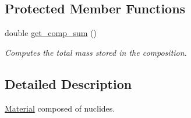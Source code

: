 \subsection*{Protected Member Functions}
\begin{DoxyCompactItemize}
\item 
\hypertarget{classpyne_1_1_material_a6bfe2556962da33cc05eb1e88bdebf42}{double \hyperlink{classpyne_1_1_material_a6bfe2556962da33cc05eb1e88bdebf42}{get\-\_\-comp\-\_\-sum} ()}\label{classpyne_1_1_material_a6bfe2556962da33cc05eb1e88bdebf42}

\begin{DoxyCompactList}\small\item\em Computes the total mass stored in the composition. \end{DoxyCompactList}\end{DoxyCompactItemize}


\subsection{Detailed Description}
\hyperlink{classpyne_1_1_material}{Material} composed of nuclides. 

